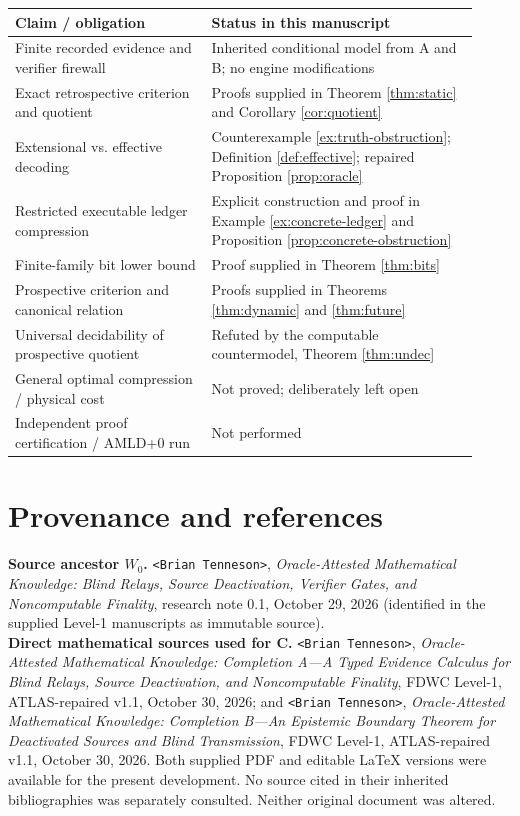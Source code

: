 \documentclass[11pt,letterpaper]{article}
\theoremstyle{definition}
\begin{document}
\begin{center}\small
\begin{tabular}{@{}p{0.39\linewidth}p{0.53\linewidth}@{}}\toprule
\textbf{Claim / obligation}&\textbf{Status in this manuscript}\\\midrule
Finite recorded evidence and verifier firewall&Inherited conditional model from A and B; no engine modifications\\
Exact retrospective criterion and quotient&Proofs supplied in Theorem \ref{thm:static} and Corollary \ref{cor:quotient}\\
Extensional vs. effective decoding&Counterexample \ref{ex:truth-obstruction}; Definition \ref{def:effective}; repaired Proposition \ref{prop:oracle}\\
Restricted executable ledger compression&Explicit construction and proof in Example \ref{ex:concrete-ledger} and Proposition \ref{prop:concrete-obstruction}\\
Finite-family bit lower bound&Proof supplied in Theorem \ref{thm:bits}\\
Prospective criterion and canonical relation&Proofs supplied in Theorems \ref{thm:dynamic} and \ref{thm:future}\\
Universal decidability of prospective quotient&Refuted by the computable countermodel, Theorem \ref{thm:undec}\\
General optimal compression / physical cost&Not proved; deliberately left open\\
Independent proof certification / AMLD+0 run&Not performed\\\bottomrule
\end{tabular}
\end{center}

\clearpage
\section*{Provenance and references}
\noindent\textbf{Source ancestor $W_0$.} \texttt{<Brian Tenneson>}, \emph{Oracle-Attested Mathematical Knowledge: Blind Relays, Source Deactivation, Verifier Gates, and Noncomputable Finality}, research note 0.1, October 29, 2026 (identified in the supplied Level-1 manuscripts as immutable source).\\[4pt]
\textbf{Direct mathematical sources used for C.} \texttt{<Brian Tenneson>}, \emph{Oracle-Attested Mathematical Knowledge: Completion A---A Typed Evidence Calculus for Blind Relays, Source Deactivation, and Noncomputable Finality}, FDWC Level-1, ATLAS-repaired v1.1, October 30, 2026; and \texttt{<Brian Tenneson>}, \emph{Oracle-Attested Mathematical Knowledge: Completion B---An Epistemic Boundary Theorem for Deactivated Sources and Blind Transmission}, FDWC Level-1, ATLAS-repaired v1.1, October 30, 2026. Both supplied PDF and editable LaTeX versions were available for the present development. No source cited in their inherited bibliographies was separately consulted. Neither original document was altered.
\end{document}
